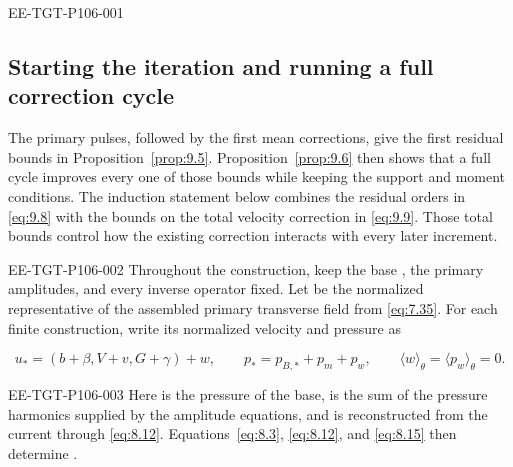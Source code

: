 %
\begin{EESegment}{EE-TGT-P106-001}
\subsection{Starting the iteration and running a full correction cycle}\label{sec:9.3}
The primary pulses, followed by the first mean corrections, give the first residual bounds in
Proposition~\ref{prop:9.5}. Proposition~\ref{prop:9.6} then shows that a full cycle improves every
one of those bounds while keeping the support and moment conditions. The induction statement below
combines the residual orders in \eqref{eq:9.8} with the bounds on the total velocity correction in
\eqref{eq:9.9}. Those total bounds control how the existing correction interacts with every later
increment.
\end{EESegment}

\begin{EESegment}{EE-TGT-P106-002}
Throughout the construction, keep the base , the primary amplitudes,
and every inverse operator fixed. Let
 be the normalized representative of the
assembled primary transverse field from \eqref{eq:7.35}. For each finite construction, write its
normalized velocity and pressure as
\end{EESegment}
\begin{equation}
u_*=(b+\beta,V+v,G+\gamma)+w,
\qquad
p_*=p_{B,*}+p_m+p_w,
\qquad
\langle w\rangle_\theta=\langle p_w\rangle_\theta=0.
\tag{9.7}\label{eq:9.7}
\end{equation}
\begin{EESegment}{EE-TGT-P106-003}
Here  is the pressure of the base,
 is the sum of the pressure harmonics supplied by the amplitude equations,
and  is reconstructed from the current
 through \eqref{eq:8.12}. Equations~\eqref{eq:8.3}, \eqref{eq:8.12}, and
\eqref{eq:8.15} then determine
.
\end{EESegment}


